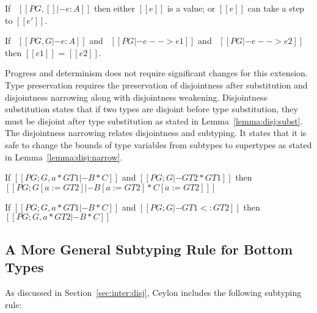 \begin{theorem}[Progress]
\label{lemma:union:poly:progress}
If \ $[[PG , [] |- e : A]]$ then either $[[e]]$ is a value;
or $[[e]]$ can take a step to $[[e']]$.
\end{theorem}

\begin{theorem}[Determinism]
\label{lemma:union:poly:determinism}
  If \ $[[PG , G |- e : A]]$ and \ $[[PG |- e --> e1]]$ and \ $[[PG |- e --> e2]]$ then $[[e1]]$ = $[[e2]]$.
\end{theorem}

\noindent Progress and determinism does not require significant changes for
this extension. Type preservation requires the preservation of disjointness
after substitution and disjointness narrowing along with disjointness weakening.
Disjointness substitution states that if two types are disjoint
before type substitution, they must be disjoint after type substitution
as stated in Lemma~\ref{lemma:disj:subst}.
The disjointness narrowing relates disjointness
and subtyping. It states that it is safe to change the bounds of type variables
from subtypes to supertypes as stated in Lemma~\ref{lemma:disj:narrow}.

\begin{lemma}\label{lemma:disj:subst}
  If $[[PG ; G , a * GT1 |- B * C]]$ and $[[PG ; G |- GT2 * GT1]]$
  then $[[PG ; G [ a := GT2 ] |-  B [ a := GT2 ] * C [ a := GT2 ] ]]$
\end{lemma}

\begin{lemma}\label{lemma:disj:narrow}
  If $[[PG ; G , a * GT1 |- B * C]]$ and $[[PG ; G |- GT1 <: GT2]]$
  then $[[PG ; G , a * GT2 |- B * C]]$
\end{lemma}



\subsection{A More General Subtyping Rule for Bottom  Types}
\label{sec:inter:refactoring}
As discussed in Section~\ref{sec:inter:disj}, Ceylon includes the following subtyping rule:

\begin{center}
\end{center}

